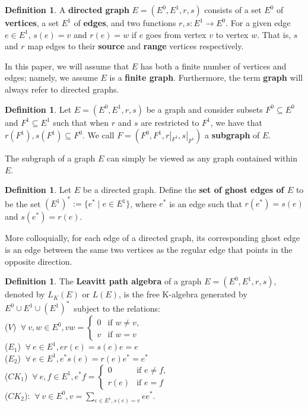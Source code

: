 \documentclass[12pt]{amsart}
\theoremstyle{plain} \numberwithin{equation}{section}
\theoremstyle{definition}
\newtheorem{definition}[theorem]{Definition}
\newcommand{\frall}{\:\forall\:}
\theoremstyle{definition}
\begin{document}
\begin{definition} A \textbf{directed graph} $E = (E^0, E^1, r, s)$ consists of a set $E^0$ of \textbf{vertices}, a set $E^1$ of \textbf{edges}, and two functions $r,s : E^1\rightarrow E^0$. For a given edge $e \in E^1$, $s(e) = v$ and $r(e) = w$ if $e$ goes from vertex $v$ to vertex $w$. That is, $s$ and $r$ map edges to their \textbf{source} and \textbf{range} vertices respectively.

In this paper, we will assume that $E$ has both a finite number of vertices and edges; namely, we assume $E$ is a \textbf{finite graph}. Furthermore, the term \textbf{graph} will always refer to directed graphs. 
\end{definition}

\begin{definition} Let $E = (E^0, E^1, r, s)$ be a graph and consider subsets $F^0\subseteq E^0$ and $F^1 \subseteq E^1$ such that when $r$ and $s$ are restricted to $F^1$, we have that $r(F^1),s(F^1)\subseteq F^0$. We call $F = (F^0, F^1, r|_{F^1}, s|_{F^1})$ a \textbf{subgraph} of $E$. 
\end{definition}

The subgraph of a graph $E$ can simply be viewed as any graph contained within $E$. 

\begin{definition}
    Let $E$ be a directed graph. Define the \textbf{set of ghost edges of $E$} to be the set $(E^1)^* := \{e^* \mid e\in E^1\}$, where $e^*$ is an edge such that $r(e^*) = s(e)$ and $s(e^*) = r(e)$. 
\end{definition}

More colloquially, for each edge of a directed graph, its corresponding ghost edge is an edge between the same two vertices as the regular edge that points in the opposite direction.

\begin{definition} The \textbf{Leavitt path algebra} of a graph $E = (E^0, E^1, r, s)$, denoted by $L_K(E)$ or $L(E)$, is the free K-algebra generated by $E^0 \cup E^1 \cup (E^1)^*$\ subject to the relations: \\ 

($V$) $\frall v, w \in E^0, vw =
    \begin{cases}
        0 &\text{if } w\neq v, \\
        v &\text{if } w = v
    \end{cases}$ \\

($E_1$) $\frall e \in E^1, er(e) = s(e)e = e$\\

($E_2$) $\frall e \in E^1, e^*s(e)= r(e)e^* = e^*$ \\

($CK_1$) $\frall e, f \in E^1, e^*f =
    \begin{cases}
        0 &\text{if } e\neq f, \\
        r(e) &\text{if } e = f
    \end{cases}$ \\

($CK_2$): $\frall v \in E^0, v = \sum_{e \in E^1, s(e)=v} ee^*$.  
\end{definition}
\end{document}
